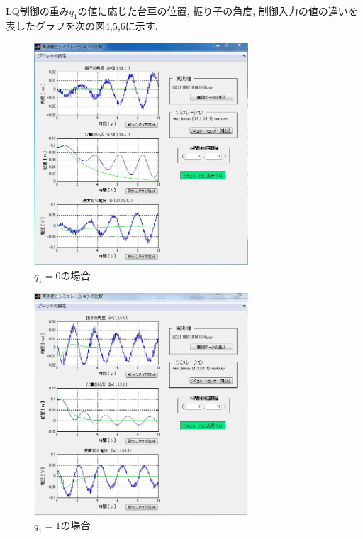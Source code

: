 \documentclass[a4paper,11pt]{jsarticle}
\begin{document}
\subsection{}
LQ制御の重み$q_1$の値に応じた台車の位置, 振り子の角度, 制御入力の値の違いを表したグラフを次の図4,5,6に示す.
\begin{figure}[H]
	\begin{center}
		\includegraphics[width=8cm]{比較1.jpg}
		\caption{$q_1=0$の場合}
		\label{$q_1=0$の場合}
	\end{center}
\end{figure}

\begin{figure}[H]
	\begin{center}
		\includegraphics[width=8cm]{比較2.jpg}
		\caption{$q_1=1$の場合}
		\label{$q_1=1$の場合}
	\end{center}
\end{figure}
\end{document}
